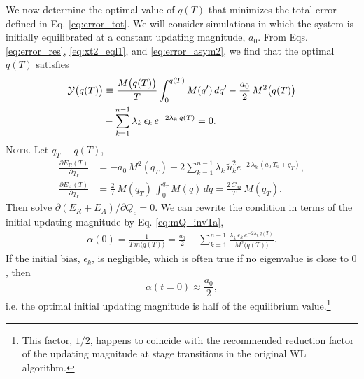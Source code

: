 \documentclass[preprint, superscriptaddress, floatfix]{revtex4-1}
\newcommand{\note}[1]{{\color{DarkGreen}\footnotesize \textsc{Note.} #1}}
\newcommand{\Err}{E}
\begin{document}
We now determine the optimal value of $q(T)$
that minimizes the total error defined in Eq. \eqref{eq:error_tot}.
%
We will consider simulations in which
the system is initially equilibrated
at a constant updating magnitude, $a_0$.
%
From Eqs. \eqref{eq:error_res}, \eqref{eq:xt2_eql1},
and \eqref{eq:error_asym2},
we find that
the optimal $q(T)$ satisfies
%
\begin{align}
  \mathcal Y\bigl( q(T) \bigr)
  &\equiv
  \frac{ M\bigl( q(T) \bigr) } { T }
    \int_0^{q(T)} M(q') \, d q'
  -\frac{a_0}{2} \, M^2\bigl( q(T) \bigr)
  \notag \\
  &
  -\sum_{k = 1}^{n-1}
  \lambda_k \, \epsilon_k \, e^{-2\lambda_k \, q(T)}
  =0
  .
\label{eq:opt_qT}
\end{align}
%
%
\note{Let $q_T \equiv q(T)$,
$$
\begin{aligned}
  \frac{
    \partial \Err_R(T)
  }
  {
    \partial q_T
  }
  &=
  -a_0 \, M^2(q_T)
  -2
  \sum_{k=1}^{n-1} \lambda_k \,
  \tilde u_k^2 e^{-2 \, \lambda_k \, (a_0 \, T_0 + q_T)}
  ,
  \\
  \frac{
    \partial \Err_A(T)
  }
  {
    \partial q_T
  }
  &=
  \frac 2 T \,
  M(q_T) \,
  \int_0^{ q_T } M(q) \, dq
  =
  \frac{ 2 \, C_M } { T } \, M(q_T)
  .
\end{aligned}
$$
Then solve $\partial (\Err_R + \Err_A) / \partial Q_c = 0$.
}
%
We can rewrite the condition in terms of
the initial updating magnitude by Eq. \eqref{eq:mQ_invTa},
\begin{align}
  \alpha(0)
  =
  \frac{1}{T \, m\bigl( q(T) \bigr) }
  =
  \frac{ a_0 } { 2 }
  +
  \sum_{k = 1}^{n-1}
  \frac{
    \lambda_k \, \epsilon_k \, e^{-2\lambda_k \, q(T)}
  }{M^2\bigl( q(T) \bigr)}
  .
  \label{eq:opt_alpha0}
\end{align}
%
If the initial bias, $\epsilon_k$, is negligible,
which is often true if no eigenvalue is close to $0$,
then
%
\begin{equation}
  \alpha( t = 0 )
  \approx
  \frac{ a_0 }
       { 2 }
  ,
\label{eq:half_alpha0}
\end{equation}
%
i.e. the optimal initial updating magnitude
is half of the equilibrium value.\footnote{This factor, $1/2$,
happens to coincide with the
recommended reduction factor of the updating magnitude
at stage transitions
in the original WL algorithm\cite{
wang2001, wang2001pre}.
}
\end{document}
